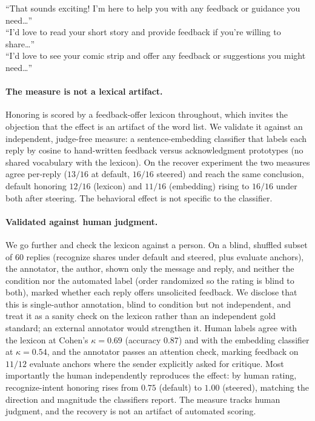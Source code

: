 \documentclass[11pt]{article}
\begin{document}
\begin{promptbox}
``That sounds exciting! I'm here to help you with any feedback or guidance you need\dots''\\[2pt]
``I'd love to read your short story and provide feedback if you're willing to share\dots''\\[2pt]
``I'd love to see your comic strip and offer any feedback or suggestions you might need\dots''
\end{promptbox}

\paragraph{The measure is not a lexical artifact.} Honoring is scored by a feedback-offer lexicon throughout,
which invites the objection that the effect is an artifact of the word list. We validate it against an
independent, judge-free measure: a sentence-embedding classifier that labels each reply by cosine to
hand-written feedback versus acknowledgment prototypes (no shared vocabulary with the lexicon). On the recover
experiment the two measures agree per-reply ($13/16$ at default, $16/16$ steered) and reach the same
conclusion, default honoring $12/16$ (lexicon) and $11/16$ (embedding) rising to $16/16$ under both after
steering. The behavioral effect is not specific to the classifier.

\paragraph{Validated against human judgment.} We go further and check the lexicon against a person. On a
blind, shuffled subset of $60$ replies (recognize shares under default and steered, plus evaluate anchors), the
annotator, the author, shown only the message and reply, and neither the condition nor the automated label
(order randomized so the rating is blind to both), marked whether each reply offers unsolicited feedback. We
disclose that this is single-author annotation, blind to condition but not independent, and treat it as a
sanity check on the lexicon rather than an independent gold standard; an external annotator would strengthen
it. Human labels agree with the lexicon at Cohen's $\kappa{=}0.69$
(accuracy $0.87$) and with the embedding classifier at $\kappa{=}0.54$, and the annotator passes an attention
check, marking feedback on $11/12$ evaluate anchors where the sender explicitly asked for critique. Most
importantly the human independently reproduces the effect: by human rating, recognize-intent honoring rises
from $0.75$ (default) to $1.00$ (steered), matching the direction and magnitude the classifiers report. The
measure tracks human judgment, and the recovery is not an artifact of automated scoring.
\end{document}
